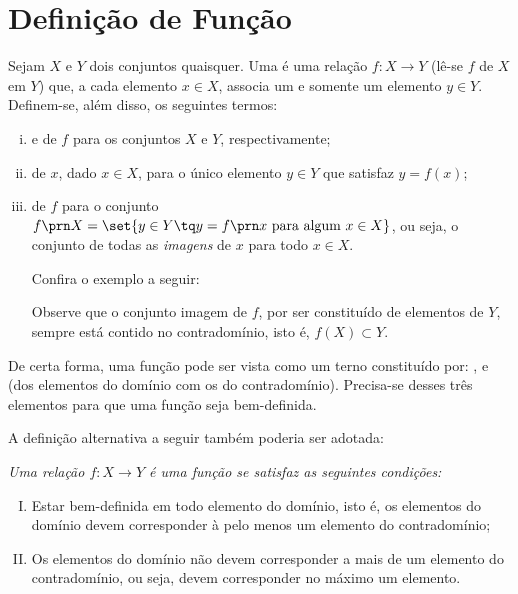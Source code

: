 \section{Definição de Função}

\begin{definition}
Sejam $X$ e $Y$ dois conjuntos quaisquer.
Uma  é uma relação $f: X \to Y$ (lê-se $f$ de $X$ em $Y$) que, a cada elemento $x \in X$, associa um e somente um elemento $y \in Y$.
Definem-se, além disso, os seguintes termos:
%
\begin{enumerate}[(i)]
\item {} e  de $f$ para os conjuntos $X$ e $Y$, respectivamente;
\item {} de $x$, dado $x \in X$, para o único elemento $y \in Y$ que satisfaz $y = f(x)$;
\item {} de $f$ para o conjunto $f\prn X = \set{y \in Y \tq y = f \prn x \text{ para algum } x \in X }$, ou seja, o conjunto de todas as \emph{imagens} de $x$ para todo $x \in X$.

Confira o exemplo a seguir:
\begin{center}
    
\end{center}
Observe que o conjunto imagem de $f$, por ser constituído de elementos de $Y$, sempre está contido no contradomínio, isto é, $f(X) \subset Y$.
\end{enumerate}
\end{definition}

De certa forma, uma função pode ser vista como um terno constituído por: ,  e  (dos elementos do domínio com os do contradomínio). 
Precisa-se desses três elementos para que uma função seja bem-definida. 

A definição alternativa a seguir também poderia ser adotada:
{\it Uma relação $f: X \to Y$ é uma \emph {função} se satisfaz as seguintes condições:
%
\begin{enumerate}[(I)]
  \item Estar bem-definida em todo elemento do domínio, isto é, os elementos do domínio devem corresponder à pelo menos um elemento do contradomínio;
  \item Os elementos do domínio não devem corresponder a mais de um elemento do contradomínio, ou seja, devem corresponder no máximo um elemento.
\end{enumerate}}


